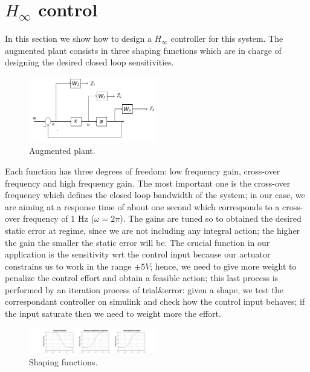 \section{$H_{\infty}$ control}
In this section we show how to design a $H_{\infty}$ controller for this system. The augmented plant consists in three shaping functions which are in charge of designing the desired closed loop sensitivities.\\

\begin{figure}[H]
\includegraphics[width=0.5\textwidth]{img/hinf_scheme.png}
\caption{Augmented plant.}
\end{figure}

Each function has three degrees of freedom: low frequency gain, cross-over frequency and high frequency gain. The most important one is the cross-over frequency which defines the closed loop bandwidth of the system; in our case, we are aiming at a response time of about one second which corresponds to a cross-over frequency of 1 Hz ($\omega=2\pi$). The gains are tuned so to obtained the desired static error at regime, since we are not including any integral action; the higher the gain the smaller the static error will be. The crucial function in our application is the sensitivity wrt the control input because our actuator constrains us to work in the range $\pm 5V$; hence, we need to give more weight to penalize the control effort and obtain a feasible action; this last process is performed by an iteration process of trial&error: given a shape, we test the correspondant controller on simulink and check how the control input behaves; if the input saturate then we need to weight more the effort.\\

\begin{figure}[H]
\includegraphics[width=0.5\textwidth]{img/hinf_shapes.jpg}
\caption{Shaping functions.}
\end{figure}

